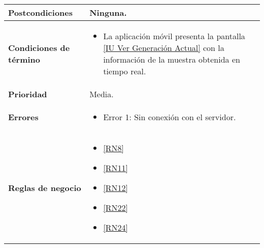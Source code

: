 \begin{longtable}{|J{5cm}|J{10.3cm}|}
	\textbf{Postcondiciones} &
		Ninguna.\\ \hline
	\textbf{Condiciones de término} & 
		\begin{itemize}
			\item La aplicación móvil presenta la pantalla \hyperref[fig:monitoreoReal]{[IU Ver Generación Actual]} con la información de la muestra obtenida en tiempo real.
		\end{itemize} \\ \hline 
	\textbf{Prioridad} & 
		Media. \\ \hline
	\textbf{Errores} & 
		\begin{itemize}
		    \item \label{CUU1.1:Error1} Error 1: Sin conexión con el servidor.
		\end{itemize} \\ \hline
	\textbf{Reglas de negocio} & 
		\begin{itemize}
		    \item \ref{RN8}
			\item \ref{RN11}
			\item \ref{RN12}
			\item \ref{RN22}
			\item \ref{RN24}
		\end{itemize} \\ \hline
\end{longtable}


